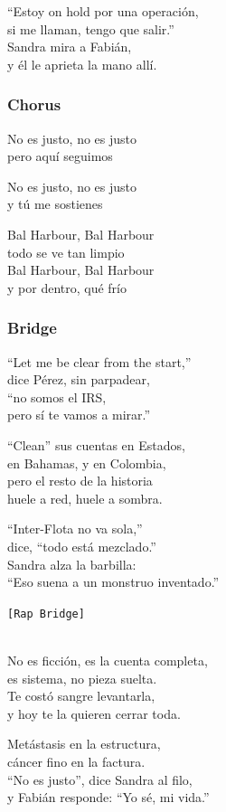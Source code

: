 ``Estoy on hold por una operación,\\
si me llaman, tengo que salir.''\\
Sandra mira a Fabián,\\
y él le aprieta la mano allí.

\subsubsection{Chorus}\label{chorus-44}

No es justo, no es justo\\
pero aquí seguimos

No es justo, no es justo\\
y tú me sostienes

Bal Harbour, Bal Harbour\\
todo se ve tan limpio\\
Bal Harbour, Bal Harbour\\
y por dentro, qué frío

\subsubsection{Bridge}\label{bridge-13}

``Let me be clear from the start,''\\
dice Pérez, sin parpadear,\\
``no somos el IRS,\\
pero sí te vamos a mirar.''

``Clean'' sus cuentas en Estados,\\
en Bahamas, y en Colombia,\\
pero el resto de la historia\\
huele a red, huele a sombra.

``Inter-Flota no va sola,''\\
dice, ``todo está mezclado.''\\
Sandra alza la barbilla:\\
``Eso suena a un monstruo inventado.''

\texttt{{[}Rap\ Bridge{]}}\strut \\
No es ficción, es la cuenta completa,\\
es sistema, no pieza suelta.\\
Te costó sangre levantarla,\\
y hoy te la quieren cerrar toda.

Metástasis en la estructura,\\
cáncer fino en la factura.\\
``No es justo'', dice Sandra al filo,\\
y Fabián responde: ``Yo sé, mi vida.''

